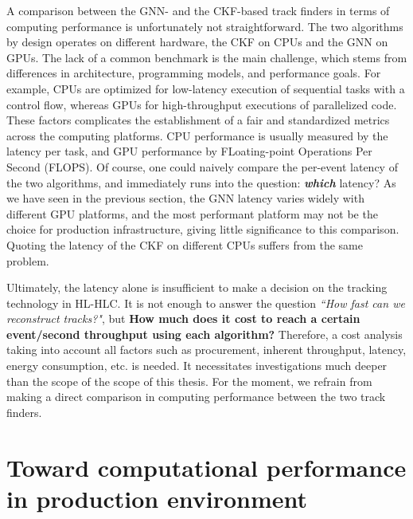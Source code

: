 A comparison between the GNN- and the CKF-based track finders in terms of computing performance is unfortunately not straightforward.
The two algorithms by design operates on different hardware, the CKF on CPUs and the GNN on GPUs. 
The lack of a common benchmark is the main challenge, which stems from differences in architecture, programming models, and performance goals. 
For example, CPUs are optimized for low-latency execution of sequential tasks with a control flow, whereas GPUs for high-throughput executions of parallelized code.
These factors complicates the establishment of a fair and standardized metrics across the computing platforms. 
CPU performance is usually measured by the latency per task, and GPU performance by FLoating-point Operations Per Second (FLOPS).
Of course, one could naively compare the per-event latency of the two algorithms, and immediately runs into the question: \textit{\textbf{which}} latency? 
As we have seen in the previous section, the GNN latency varies widely with different GPU platforms, and the most performant platform may not be the choice for production infrastructure, giving little significance to this comparison. 
Quoting the latency of the CKF on different CPUs suffers from the same problem. 

Ultimately, the latency alone is insufficient to make a decision on the tracking technology in HL-HLC. 
It is not enough to answer the question \textit{``How fast can we reconstruct tracks?"}, but \textbf{How much does it cost to reach a certain event/second throughput using each algorithm?}
Therefore, a cost analysis taking into account all factors such as procurement, inherent throughput, latency, energy consumption, etc. is needed.
It necessitates investigations much deeper than the scope of the scope of this thesis.
For the moment, we refrain from making a direct comparison in computing performance between the two track finders.

\section{Toward computational performance in production environment}

